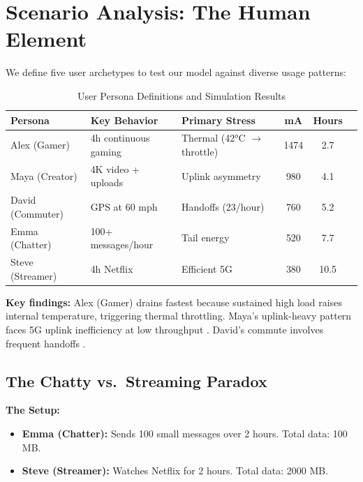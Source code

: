 \documentclass[12pt]{article}
\begin{document}
\section{Scenario Analysis: The Human Element}

We define five user archetypes to test our model against diverse usage patterns:

\begin{table}[htbp]
\centering
\caption{User Persona Definitions and Simulation Results}
\label{tab:personas}
\begin{tabular}{@{}lllccc@{}}
\toprule
\textbf{Persona} & \textbf{Key Behavior} & \textbf{Primary Stress} & \textbf{mA} & \textbf{Hours} \\
\midrule
Alex (Gamer) & 4h continuous gaming & Thermal (42°C $\to$ throttle) & 1474 & 2.7 \\
Maya (Creator) & 4K video + uploads & Uplink asymmetry & 980 & 4.1 \\
David (Commuter) & GPS at 60 mph & Handoffs (23/hour) & 760 & 5.2 \\
Emma (Chatter) & 100+ messages/hour & Tail energy & 520 & 7.7 \\
Steve (Streamer) & 4h Netflix & Efficient 5G & 380 & 10.5 \\
\bottomrule
\end{tabular}
\end{table}

\textbf{Key findings:} Alex (Gamer) drains fastest because sustained high load raises internal temperature, triggering thermal throttling. Maya's uplink-heavy pattern faces 5G uplink inefficiency at low throughput \cite{narayanan_5g}. David's commute involves frequent handoffs \cite{narayanan_5g}.

\subsection{The Chatty vs.\ Streaming Paradox}
\label{sec:paradox}

\textbf{The Setup:}
\begin{itemize}
    \item \textbf{Emma (Chatter):} Sends 100 small messages over 2 hours. Total data: 100 MB.
    \item \textbf{Steve (Streamer):} Watches Netflix for 2 hours. Total data: 2000 MB.
\end{itemize}
\end{document}
